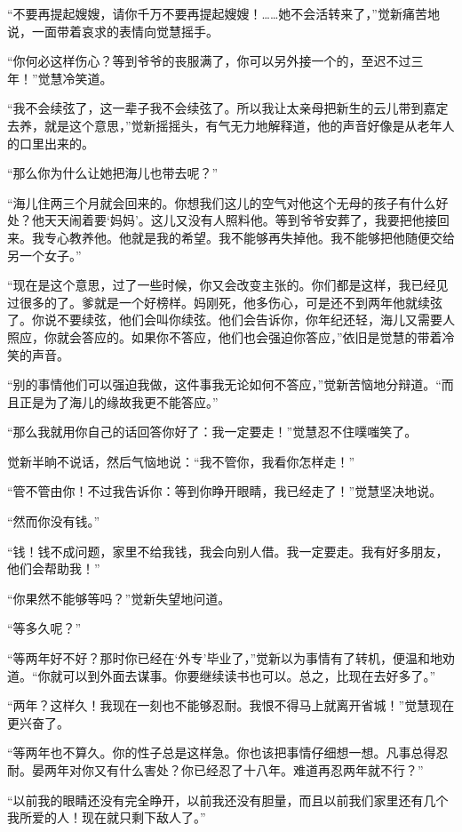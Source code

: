 \par “不要再提起嫂嫂，请你千万不要再提起嫂嫂！……她不会活转来了，”觉新痛苦地说，一面带着哀求的表情向觉慧摇手。
\par “你何必这样伤心？等到爷爷的丧服满了，你可以另外接一个的，至迟不过三年！”觉慧冷笑道。
\par “我不会续弦了，这一辈子我不会续弦了。所以我让太亲母把新生的云儿带到嘉定去养，就是这个意思，”觉新摇摇头，有气无力地解释道，他的声音好像是从老年人的口里出来的。
\par “那么你为什么让她把海儿也带去呢？”
\par “海儿住两三个月就会回来的。你想我们这儿的空气对他这个无母的孩子有什么好处？他天天闹着要‘妈妈’。这儿又没有人照料他。等到爷爷安葬了，我要把他接回来。我专心教养他。他就是我的希望。我不能够再失掉他。我不能够把他随便交给另一个女子。”
\par “现在是这个意思，过了一些时候，你又会改变主张的。你们都是这样，我已经见过很多的了。爹就是一个好榜样。妈刚死，他多伤心，可是还不到两年他就续弦了。你说不要续弦，他们会叫你续弦。他们会告诉你，你年纪还轻，海儿又需要人照应，你就会答应的。如果你不答应，他们也会强迫你答应，”依旧是觉慧的带着冷笑的声音。
\par “别的事情他们可以强迫我做，这件事我无论如何不答应，”觉新苦恼地分辩道。“而且正是为了海儿的缘故我更不能答应。”
\par “那么我就用你自己的话回答你好了：我一定要走！”觉慧忍不住噗嗤笑了。
\par 觉新半晌不说话，然后气恼地说：“我不管你，我看你怎样走！”
\par “管不管由你！不过我告诉你：等到你睁开眼睛，我已经走了！”觉慧坚决地说。
\par “然而你没有钱。”
\par “钱！钱不成问题，家里不给我钱，我会向别人借。我一定要走。我有好多朋友，他们会帮助我！”
\par “你果然不能够等吗？”觉新失望地问道。
\par “等多久呢？”
\par “等两年好不好？那时你已经在‘外专’毕业了，”觉新以为事情有了转机，便温和地劝道。“你就可以到外面去谋事。你要继续读书也可以。总之，比现在去好多了。”
\par “两年？这样久！我现在一刻也不能够忍耐。我恨不得马上就离开省城！”觉慧现在更兴奋了。
\par “等两年也不算久。你的性子总是这样急。你也该把事情仔细想一想。凡事总得忍耐。晏两年对你又有什么害处？你已经忍了十八年。难道再忍两年就不行？”
\par “以前我的眼睛还没有完全睁开，以前我还没有胆量，而且以前我们家里还有几个我所爱的人！现在就只剩下敌人了。”
